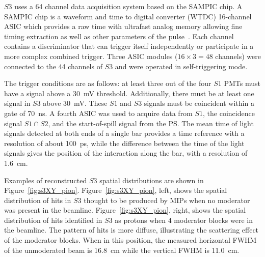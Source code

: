 $\mathit{S3}$ uses a 64 channel data acquisition system based on the SAMPIC chip.
A SAMPIC chip is a waveform and time to digital converter (WTDC) 16-channel ASIC which provides a raw time with ultrafast analog memory allowing fine timing extraction as well as other parameters of the pulse~\cite{SAMPIC}.
Each channel contains a discriminator that can trigger itself independently or participate in a more complex combined trigger. 
Three ASIC modules ($16\times3=48$ channels) were connected to the 44 channels of $\mathit{S3}$ and were operated in self-triggering mode.

The trigger conditions are as follows: at least three out of the four $\mathit{S1}$ PMTs must have a signal above a 30~mV threshold.
Additionally, there must be at least one signal in $\mathit{S3}$ above 30~mV.
These $\mathit{S1}$ and $\mathit{S3}$ signals must be coincident within a gate of 70~ns.
A fourth ASIC was used to acquire data from $\mathit{S1}$, the coincidence signal $\mathit{S1} \cap \mathit{S2}$, and the start-of-spill signal from the PS.
The mean time of light signals detected at both ends of a single bar provides a time reference with a resolution of about 100~ps, while the difference between the time of the light signals gives the position of the interaction along the bar, with a resolution of 1.6~cm.

Examples of reconstructed $\mathit{S3}$ spatial distributions are shown in Figure~\ref{fig:s3XY_pion}.
Figure~\ref{fig:s3XY_pion}, left, shows the spatial distribution of hits in $\mathit{S3}$ thought to be produced by MIPs when no moderator was present in the beamline.
Figure~\ref{fig:s3XY_pion}, right, shows the spatial distribution of hits identified in $\mathit{S3}$ as protons when 4 moderator blocks were in the beamline.
The pattern of hits is more diffuse, illustrating the scattering effect of the moderator blocks.
When in this position, the measured horizontal FWHM of the unmoderated beam is 16.8~cm while the vertical FWHM is 11.0~cm.

